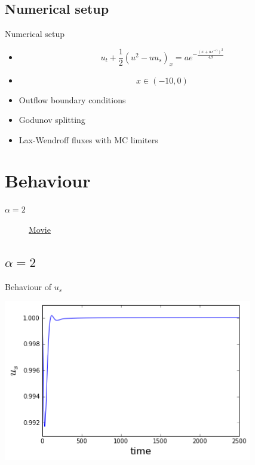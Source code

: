 \documentclass{beamer}
\begin{document}
\subsection{Numerical setup}
\begin{frame}{Numerical setup}
	\begin{itemize}
		\item \[u_t +\frac{1}{2}(u^2-uu_s)_x =a e^{-\frac{(x+us^{-\alpha})^2}{4\beta}} \]
		\item \[x\in (-10,0)\]
		\item Outflow boundary conditions
		\item Godunov splitting
		\item Lax-Wendroff fluxes with MC limiters 
	\end{itemize}
    
	
\end{frame}	


\section{Behaviour}
\begin{frame}{$\alpha = 2$}
	\begin{figure}[h!]
\href{https://www.youtube.com/watch?v=E4f0I4teyIc}{Movie}
	\end{figure} 
\end{frame}
\subsection{$\alpha = 2$}
\begin{frame}{Behaviour of $u_s$}
	\begin{center}
		\includegraphics[height=200pt]{2}\\
		
	\end{center}	
\end{frame}
\end{document}
